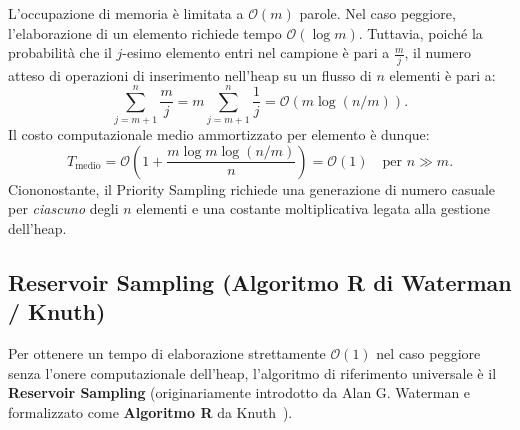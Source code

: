 \begin{property}
L'occupazione di memoria è limitata a $\mathcal{O}(m)$ parole. Nel caso peggiore, l'elaborazione di un elemento richiede tempo $\mathcal{O}(\log m)$. Tuttavia, poiché la probabilità che il $j$-esimo elemento entri nel campione è pari a $\frac{m}{j}$, il numero atteso di operazioni di inserimento nell'heap su un flusso di $n$ elementi è pari a:
\begin{equation}
  \sum_{j=m+1}^n \frac{m}{j} = m \sum_{j=m+1}^n \frac{1}{j} = \mathcal{O}(m \log(n/m)).
\end{equation}
Il costo computazionale medio ammortizzato per elemento è dunque:
\begin{equation}
  T_{\text{medio}} = \mathcal{O}\!\left(1 + \frac{m \log m \log(n/m)}{n}\right) = \mathcal{O}(1) \quad \text{per } n \gg m.
\end{equation}
Ciononostante, il Priority Sampling richiede una generazione di numero casuale per \emph{ciascuno} degli $n$ elementi e una costante moltiplicativa legata alla gestione dell'heap.
\end{property}

\FloatBarrier
\subsection{Reservoir Sampling (Algoritmo R di Waterman / Knuth)}
Per ottenere un tempo di elaborazione strettamente $\mathcal{O}(1)$ nel caso peggiore senza l'onere computazionale dell'heap, l'algoritmo di riferimento universale è il \textbf{Reservoir Sampling} (originariamente introdotto da Alan G. Waterman e formalizzato come \textbf{Algoritmo R} da Knuth~\cite{knuth1997}).

